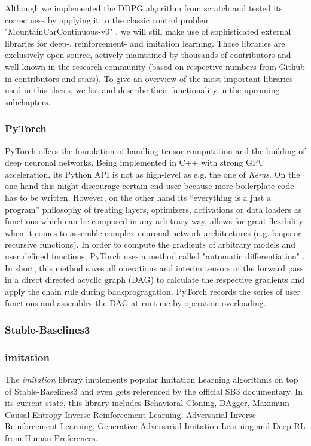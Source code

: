 Although we implemented the DDPG algorithm from scratch and tested its correctness by applying it to the classic control problem "MountainCarContinuous-v0" \cite[]{moore1990efficient}, we will still make use of sophisticated external libraries for deep-, reinforcement- and imitation learning. Those libraries are exclusively open-source, actively maintained by thousands of contributors and well known in the research community (based on respective numbers from Github in contributors and stars). To give an overview of the most important libraries used in this thesis, we list and describe their functionality in the upcoming subchapters.

\subsubsection{PyTorch}
PyTorch \cite[]{NEURIPS2019_9015} offers the foundation of handling tensor computation and the building of deep neuronal networks. Being implemented in C++ with strong GPU acceleration, its Python API is not as high-level as e.g. the one of \textit{Keras}. On the one hand this might discourage certain end user because more boilerplate code has to be written. However, on the other hand its  “everything is a just a program” philosophy \cite[p.~4]{NEURIPS2019_9015} of treating layers, optimizers, activations or data loaders as functions which can be composed in any arbitrary way, allows for great flexibility when it comes to assemble complex neuronal network architectures (e.g. loops or recursive functions). In order to compute the gradients of arbitrary models and user defined functions, PyTorch uses a method called "automatic differentiation" \cite[p.~5]{NEURIPS2019_9015}. In short, this method saves all operations and interim tensors of the forward pass in a direct directed acyclic graph (DAG) to calculate the respective gradients and apply the chain rule during backprogragation. PyTorch records the series of user functions and assembles the DAG at runtime by operation overloading.

\subsubsection{Stable-Baselines3}


\subsubsection{imitation}
The \textit{imitation} library \cite[]{wang2020imitation} implements popular Imitation Learning algorithms on top of Stable-Baselines3 and even gets referenced by the official SB3 documentary. In its current state, this library includes Behavioral Cloning, DAgger, Maximum Causal Entropy Inverse Reinforcement Learning, Adversarial Inverse Reinforcement Learning, Generative Adversarial Imitation Learning and Deep RL from Human Preferences.

